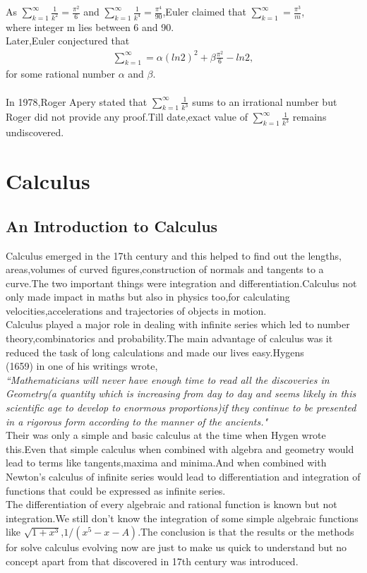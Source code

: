 \documentclass[a4paper,reqno,11pt]{book}
\theoremstyle{plain}%
\theoremstyle{definition}
\begin{document}
\noindent As $\sum_{k=1}^{\infty}\frac{1}{k^2}=\frac{\pi^2}{6}$ and $\sum_{k=1}^{\infty}\frac{1}{k^4}=\frac{\pi^4}{90}$,Euler claimed that $\sum_{k=1}^{\infty}=\frac{\pi^3}{m}$,
\\where integer m lies between 6 and 90.\\
Later,Euler conjectured that 
\begin{eqnarray*}
    \sum_{k=1}^{\infty}=\alpha(ln2)^2+\beta\frac{\pi^2}{6}-ln2,
\end{eqnarray*}
for some rational number $\alpha$ and $\beta$.\\
\\
In 1978,Roger Apery stated that $\sum_{k=1}^{\infty}\frac{1}{k^3}$ sums to an irrational number but Roger did not provide any proof.Till date,exact value of $\sum_{k=1}^{\infty}\frac{1}{k^3}$ remains undiscovered.
\chapter{Calculus}
\section{An Introduction to Calculus}
\noindent Calculus emerged in the 17th century and this helped to find out the lengths,\\areas,volumes of curved figures,construction of normals and tangents to a curve.The two important things were integration and differentiation.Calculus not only made impact in maths but also in physics too,for calculating velocities,accelerations and trajectories of objects in motion.\\
\indent Calculus played a major role in dealing with infinite series which led to number theory,combinatorics and probability.The main advantage of calculus was it reduced the task of long calculations and made our lives easy.Hygens\\(1659) in one of his writings wrote,\\
\textit{``Mathematicians will never have enough time to read all the
 discoveries in Geometry(a quantity which is increasing from
 day to day and seems likely in this scientific age to develop
 to enormous proportions)if they continue to be presented in a
 rigorous form according to the manner of the ancients."}\cite{ref13}\\
\indent Their was only a simple and basic calculus at the time when Hygen wrote this.Even that simple calculus when combined with algebra and geometry would lead to terms like tangents,maxima and minima.And when combined with Newton's calculus of infinite series would lead to differentiation and integration of functions that could be expressed as infinite series.\\
\indent The differentiation of every algebraic and rational function is known but not integration.We still don't know the integration of some simple algebraic functions like $\sqrt{1+x^3}$,$1/(x^5-x-A)$.The conclusion is that the results or the methods for solve calculus evolving now are just to make us quick to understand but no concept apart from that discovered in 17th century was introduced.\\
\end{document}

